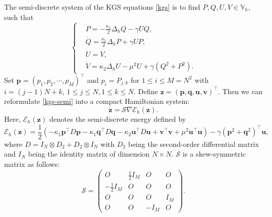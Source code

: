 \documentclass[fleqn,11pt]{elsarticle}
\numberwithin{equation}{section}
\begin{document}
The semi-discrete system of the KGS equations \eqref{kgs} is to find $P, Q, U, V \in \mathbb{V}_h$, such that
\begin{equation}\label{kgs-semi}
	\left\lbrace
	\begin{aligned}
		 & \dot{P}  = - \frac{\kappa_1}{2} \Delta_h Q - \gamma U Q,                  \\
		 & \dot{Q} =  \frac{\kappa_1}{2} \Delta_h P + \gamma U P,                    \\
		 & \dot{U} = V,                                                              \\
		 & \dot{V} =  \kappa_2 \Delta_h U - \mu^2 U + \gamma \left(Q^2 + P^2\right).
	\end{aligned}
	\right.
\end{equation}
Set $\bm p=(p_1,p_2,\cdots,p_M)^\top$ and $p_i=P_{j,k}$ for $1\leq i\leq M=N^2$ with $i=(j-1)N+k$, $1\leq j\leq N, 1\leq k\leq N$. Define $\bm z=(\bm p, \bm q, \bm u,\bm v)^\top$. Then we can reformulate \eqref{kgs-semi} into a compact Hamiltonian system:
\begin{equation}\label{kgs-semi-compact}
	\dot{\bm z} = \mathcal{S}\nabla \mathcal{E}_h(\bm z).
\end{equation}
Here, $\mathcal{E}_h\left(\bm z\right)$ denotes the semi-discrete energy defined by
\begin{equation*}
	\mathcal{E}_h\left(\bm z\right) = \frac{1}{2} \left(-\kappa_1 \bm p^\top D\bm p -\kappa_1 \bm q^\top D\bm q -\kappa_2 \bm u^\top D\bm u + \bm v^\top \bm v + \mu^2 \bm u^\top\bm u\right) - \gamma (\bm p^2 + \bm q^2)^\top\bm u,
\end{equation*}
where $D=I_N\otimes D_2+D_2\otimes I_N$ with $D_2$ being the second-order differential matrix and $I_N$ being the identity matrix of dimension $N\times N$. $\mathcal{S}$ is a skew-symmetric matrix as follows:
\begin{equation*}
	\mathcal{S} =
	\begin{pmatrix}
		O                  & \frac{1}{2} I_{M} & O      & O     \\
		-\frac{1}{2} I_{M} & O                 & O      & O     \\
		O                  & O                 & O      & I_{M} \\
		O                  & O                 & -I_{M} & O
	\end{pmatrix}.
\end{equation*}
\end{document}
